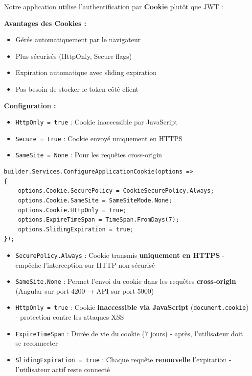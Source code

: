 \documentclass[12pt,a4paper]{article}
\begin{document}
\begin{warningbox}[title={\faKey\ Authentification par Cookie (Notre Choix)}]
Notre application utilise l'authentification par \textbf{Cookie} plutôt que JWT :

\textbf{Avantages des Cookies :}
\begin{itemize}
    \item Gérés automatiquement par le navigateur
    \item Plus sécurisés (HttpOnly, Secure flags)
    \item Expiration automatique avec sliding expiration
    \item Pas besoin de stocker le token côté client
\end{itemize}

\textbf{Configuration :}
\begin{itemize}
    \item \texttt{HttpOnly = true} : Cookie inaccessible par JavaScript
    \item \texttt{Secure = true} : Cookie envoyé uniquement en HTTPS
    \item \texttt{SameSite = None} : Pour les requêtes cross-origin
\end{itemize}
\end{warningbox}

\begin{lstlisting}[language=CSharp, caption=Configuration Cookie Authentication]
builder.Services.ConfigureApplicationCookie(options => 
{
    options.Cookie.SecurePolicy = CookieSecurePolicy.Always;
    options.Cookie.SameSite = SameSiteMode.None;
    options.Cookie.HttpOnly = true;
    options.ExpireTimeSpan = TimeSpan.FromDays(7);
    options.SlidingExpiration = true;
});
\end{lstlisting}

\begin{infobox}[title={\faLightbulb\ Explication de Chaque Option}]
\begin{itemize}
    \item \texttt{SecurePolicy.Always} : Cookie transmis \textbf{uniquement en HTTPS} - empêche l'interception sur HTTP non sécurisé
    \item \texttt{SameSite.None} : Permet l'envoi du cookie dans les requêtes \textbf{cross-origin} (Angular sur port 4200 → API sur port 5000)
    \item \texttt{HttpOnly = true} : Cookie \textbf{inaccessible via JavaScript} (\texttt{document.cookie}) - protection contre les attaques XSS
    \item \texttt{ExpireTimeSpan} : Durée de vie du cookie (7 jours) - après, l'utilisateur doit se reconnecter
    \item \texttt{SlidingExpiration = true} : Chaque requête \textbf{renouvelle} l'expiration - l'utilisateur actif reste connecté
\end{itemize}
\end{infobox}
\end{document}

